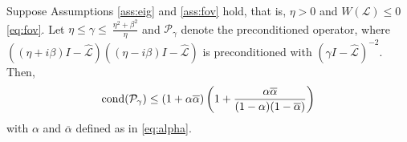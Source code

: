 \documentclass[review]{siamart}
\begin{document}
%
\begin{theorem}\label{th:cond}
Suppose Assumptions \ref{ass:eig} and \ref{ass:fov} hold, that is, $\eta > 0$
and $W(\mathcal{L}) \leq 0$ \eqref{eq:fov}. Let $\eta \leq \gamma \leq \
\tfrac{\eta^2+\beta^2}{\eta}$ and
$\mathcal{P}_\gamma$ denote the preconditioned operator, where $((\eta + i\beta)I -
\widehat{\mathcal{L}})((\eta - i\beta)I - \widehat{\mathcal{L}})$ is
preconditioned with $(\gamma I - \widehat{\mathcal{L}})^{-2}$. Then,
\begin{align}\label{eq:cond1}
\textnormal{cond}(\mathcal{P}_\gamma) \leq (1 + \alpha\overline{\alpha})
		\left(1 + \frac{\alpha\overline{\alpha}}{(1 - \alpha)(1 - \overline{\alpha})}\right)
\end{align}
with $\alpha$ and $\overline{\alpha}$ defined as in \eqref{eq:alpha}.
\end{theorem}
\end{document}
